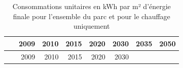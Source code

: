 \documentclass[]{article}
\begin{document}
\begin{longtable}[]{@{}crrrrrrr@{}}
\caption{Consommations unitaires en kWh par m² d'énergie finale pour
l'ensemble du parc et pour le chauffage uniquement}\tabularnewline
\toprule
\begin{minipage}[b]{0.19\columnwidth}\centering\strut
~\strut
\end{minipage} & \begin{minipage}[b]{0.08\columnwidth}\raggedleft\strut
2009\strut
\end{minipage} & \begin{minipage}[b]{0.08\columnwidth}\raggedleft\strut
2010\strut
\end{minipage} & \begin{minipage}[b]{0.08\columnwidth}\raggedleft\strut
2015\strut
\end{minipage} & \begin{minipage}[b]{0.08\columnwidth}\raggedleft\strut
2020\strut
\end{minipage} & \begin{minipage}[b]{0.08\columnwidth}\raggedleft\strut
2030\strut
\end{minipage} & \begin{minipage}[b]{0.08\columnwidth}\raggedleft\strut
2035\strut
\end{minipage} & \begin{minipage}[b]{0.08\columnwidth}\raggedleft\strut
2050\strut
\end{minipage}\tabularnewline
\midrule
\endfirsthead
\toprule
\begin{minipage}[b]{0.19\columnwidth}\centering\strut
~\strut
\end{minipage} & \begin{minipage}[b]{0.08\columnwidth}\raggedleft\strut
2009\strut
\end{minipage} & \begin{minipage}[b]{0.08\columnwidth}\raggedleft\strut
2010\strut
\end{minipage} & \begin{minipage}[b]{0.08\columnwidth}\raggedleft\strut
2015\strut
\end{minipage} & \begin{minipage}[b]{0.08\columnwidth}\raggedleft\strut
2020\strut
\end{minipage} & \begin{minipage}[b]{0.08\columnwidth}\raggedleft\strut
2030\strut
\end{minipage} & \begin{minipage}[b]{0.08\columnwidth}\raggedleft\strut

\end{minipage}
\end{longtable}
\end{document}
